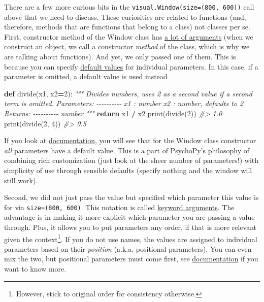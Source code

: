 \documentclass[
]{book}
\newenvironment{Shaded}{\begin{snugshade}}{\end{snugshade}}
\newcommand{\BuiltInTok}[1]{#1}
\newcommand{\CommentTok}[1]{\textcolor[rgb]{0.56,0.35,0.01}{\textit{#1}}}
\newcommand{\ControlFlowTok}[1]{\textcolor[rgb]{0.13,0.29,0.53}{\textbf{#1}}}
\newcommand{\DecValTok}[1]{\textcolor[rgb]{0.00,0.00,0.81}{#1}}
\newcommand{\KeywordTok}[1]{\textcolor[rgb]{0.13,0.29,0.53}{\textbf{#1}}}
\newcommand{\NormalTok}[1]{#1}
\newcommand{\OperatorTok}[1]{\textcolor[rgb]{0.81,0.36,0.00}{\textbf{#1}}}
\begin{document}
There are a few more curious bits in the \texttt{visual.Window(size=(800,\ 600))} call above that we need to discuss. These curiosities are related to functions (and, therefore, methods that are functions that belong to a class) not classes per se. First, constructor method of the Window class has \href{https://psychopy.org/api/visual/window.html\#psychopy.visual.Window}{a lot of arguments} (when we construct an object, we call a constructor \emph{method} of the class, which is why we are talking about functions). And yet, we only passed one of them. This is because you can specify \href{https://docs.python.org/3/tutorial/controlflow.html\#default-argument-values}{default values} for individual parameters. In this case, if a parameter is omitted, a default value is used instead

\begin{Shaded}
\begin{Highlighting}[]
\KeywordTok{def}\NormalTok{ divide(x1, x2}\OperatorTok{=}\DecValTok{2}\NormalTok{):}
  \CommentTok{"""}
\CommentTok{  Divides numbers, uses 2 as a second value if a second term is omitted.}
\CommentTok{  }
\CommentTok{  Parameters:}
\CommentTok{  {-}{-}{-}{-}{-}{-}{-}{-}{-}{-}}
\CommentTok{  x1 : number}
\CommentTok{  x2 : number, defaults to 2}
\CommentTok{  }
\CommentTok{  Returns:}
\CommentTok{  {-}{-}{-}{-}{-}{-}{-}{-}{-}{-}}
\CommentTok{  number}
\CommentTok{  """}
  \ControlFlowTok{return}\NormalTok{ x1 }\OperatorTok{/}\NormalTok{ x2}
\BuiltInTok{print}\NormalTok{(divide(}\DecValTok{2}\NormalTok{))}
\CommentTok{\#\textgreater{} 1.0}
\BuiltInTok{print}\NormalTok{(divide(}\DecValTok{2}\NormalTok{, }\DecValTok{4}\NormalTok{))}
\CommentTok{\#\textgreater{} 0.5}
\end{Highlighting}
\end{Shaded}

If you look at \href{https://psychopy.org/api/visual/window.html\#psychopy.visual.Window}{documentation}, you will see that for the Window class constructor \emph{all} parameters have a default value. This is a part of PsychoPy's philosophy of combining rich customization (just look at the sheer number of parameters!) with simplicity of use through sensible defaults (specify nothing and the window will still work).

Second, we did not just pass the value but specified which parameter this value is for via \texttt{size=(800,\ 600)}. This notation is called \href{https://docs.python.org/3/tutorial/controlflow.html\#keyword-arguments}{keyword arguments}. The advantage is in making it more explicit which parameter you are passing a value through. Plus, it allows you to put parameters any order, if that is more relevant given the context\footnote{However, stick to original order for consistency otherwise.}. If you do not use names, the values are assigned to individual parameters based on their \emph{position} (a.k.a. positional parameters). You can even mix the two, but positional parameters must come first, see \href{https://docs.python.org/3/tutorial/controlflow.html\#more-on-defining-functions}{documentation} if you want to know more.
\end{document}
